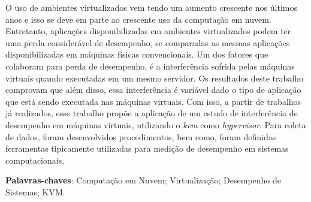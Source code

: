 \begin{resumo}
 O uso de ambientes virtualizados vem tendo um aumento crescente nos últimos anos e isso se deve em parte ao crescente uso da computação em nuvem. Entretanto, aplicações disponibilizadas em ambientes virtualizados podem ter uma perda considerável de desempenho, se comparadas as mesmas aplicações disponibilizadas em máquinas físicas convencionais. Um dos fatores que colaboram para perda de desempenho, é a interferência sofrida pelas máquinas virtuais quando executadas em um mesmo servidor. Os resultados deste trabalho comprovam que além disso, essa interferência é variável dado o tipo de aplicação que está sendo executada nas máquinas virtuais. Com isso, a partir de trabalhos já realizados, esse trabalho propõe a aplicação de um estudo de interferência de desempenho em máquinas virtuais, utilizando o \textit{kvm} como \textit{hypervisor}. Para coleta de dados, foram desenvolvidos procedimentos, bem como, foram definidas ferramentas tipicamente utilizadas para medição de desempenho em sistemas computacionais.  %




 \vspace{\onelineskip}
    
 \noindent
 \textbf{Palavras-chaves}: Computação em Nuvem; Virtualização; Desempenho de Sistemas; KVM.
\end{resumo}
